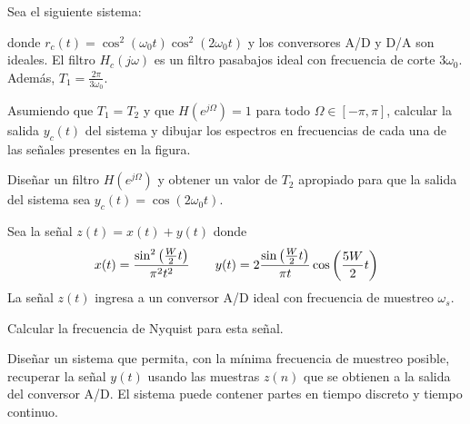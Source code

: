 \begin{ejercicio}
    Sea el siguiente sistema:
    \begin{center}
        
    \end{center}
    donde $r_c(t) = \cos^2(\omega_0t)\cos^2(2\omega_0t)$ y los conversores A/D y D/A son ideales. El filtro $H_c(j\omega)$ es un filtro pasabajos ideal con frecuencia de corte $3\omega_0$. Además, $T_1=\frac{2\pi}{3\omega_0}$.

    \inciso Asumiendo que $T_1=T_2$ y que $H(e^{j\Omega})=1$ para todo $\Omega \in [-\pi,\pi]$, calcular la salida $y_c(t)$ del sistema y dibujar los espectros en frecuencias de cada una de las señales presentes en la figura.

    \inciso Diseñar un filtro $H(e^{j\Omega})$ y obtener un valor de $T_2$ apropiado para que la salida del sistema sea $y_c(t)=\cos(2\omega_0 t)$.
\end{ejercicio}

\begin{ejercicio}
    Sea la señal $z(t) = x(t) + y(t)$ donde
    \begin{align*}
        x(t) = \frac{\sin^2\left(\frac{W}{2}t\right)}{\pi^2t^2} & \hspace*{1em} & y(t) = 2\frac{\sin\left(\frac{W}{2}t\right)}{\pi t} \cos\left(\frac{5W}{2}t\right)
    \end{align*}
    La señal $z(t)$ ingresa a un conversor A/D ideal con frecuencia de muestreo $\omega_s$.

    \inciso Calcular la frecuencia de Nyquist para esta señal.

    \inciso Diseñar un sistema que permita, con la mínima frecuencia de muestreo posible, recuperar la señal $y(t)$ usando las muestras $z(n)$ que se obtienen a la salida del conversor A/D. El sistema puede contener partes en tiempo discreto y tiempo continuo.
\end{ejercicio}


%         
   
